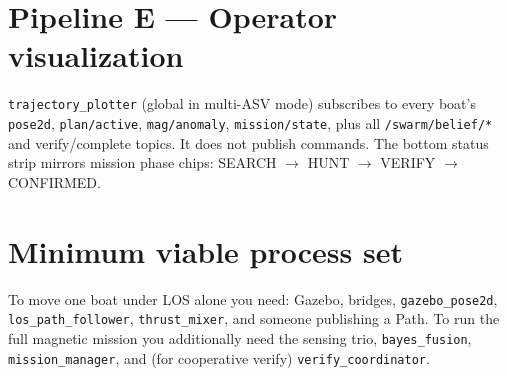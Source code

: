 \section{Pipeline E --- Operator visualization}
\texttt{trajectory\_plotter} (global in multi-ASV mode) subscribes to every
boat's \texttt{pose2d}, \texttt{plan/active}, \texttt{mag/anomaly},
\texttt{mission/state}, plus all \texttt{/swarm/belief/*} and verify/complete
topics. It does not publish commands. The bottom status strip mirrors mission
phase chips: SEARCH $\rightarrow$ HUNT $\rightarrow$ VERIFY $\rightarrow$
CONFIRMED.

\section{Minimum viable process set}
To move one boat under LOS alone you need: Gazebo, bridges,
\texttt{gazebo\_pose2d}, \texttt{los\_path\_follower}, \texttt{thrust\_mixer},
and someone publishing a Path. To run the full magnetic mission you additionally
need the sensing trio, \texttt{bayes\_fusion}, \texttt{mission\_manager}, and
(for cooperative verify) \texttt{verify\_coordinator}.
